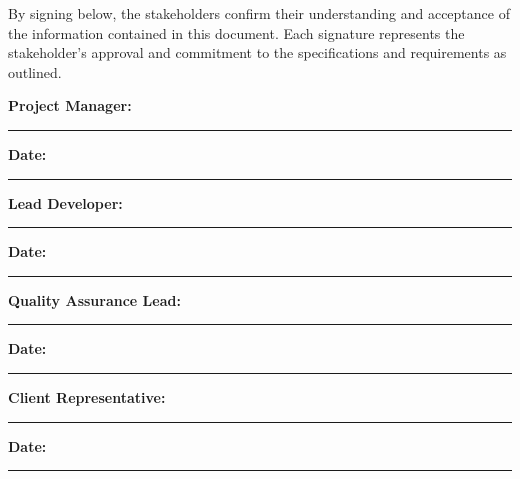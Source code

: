 By signing below, the stakeholders confirm their understanding and acceptance of the information contained in this document. Each signature represents the stakeholder's approval and commitment to the specifications and requirements as outlined.

\vspace{2cm}

\noindent
\textbf{Project Manager:} \hfill \rule{6cm}{.6pt} \hspace*{1cm} \textbf{Date:} \hfill \rule{3cm}{.6pt}

\vspace{2cm}

\noindent
\textbf{Lead Developer:} \hfill \rule{6cm}{.6pt} \hspace*{1cm} \textbf{Date:} \hfill \rule{3cm}{.6pt}

\vspace{2cm}

\noindent
\textbf{Quality Assurance Lead:} \hfill \rule{6cm}{.6pt} \hspace*{1cm} \textbf{Date:} \hfill \rule{3cm}{.6pt}

\vspace{2cm}

\noindent
\textbf{Client Representative:} \hfill \rule{6cm}{.6pt} \hspace*{1cm} \textbf{Date:} \hfill \rule{3cm}{.6pt}

\vspace{1cm}